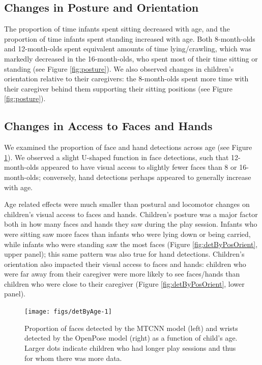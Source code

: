 \documentclass[10pt, letterpaper]{article}
\newenvironment{CodeChunk}{}{}
\begin{document}
\subsection{Changes in Posture and
Orientation}\label{changes-in-posture-and-orientation}

The proportion of time infants spent sitting decreased with age, and the
proportion of time infants spent standing increased with age. Both
8-month-olds and 12-month-olds spent equivalent amounts of time
lying/crawling, which was markedly decreased in the 16-month-olds, who
spent most of their time sitting or standing (see Figure
\ref{fig:posture}). We also observed changes in children's orientation
relative to their caregivers: the 8-month-olds spent more time with
their caregiver behind them supporting their sitting positions (see
Figure \ref{fig:posture}).

\subsection{Changes in Access to Faces and
Hands}\label{changes-in-access-to-faces-and-hands}

We examined the proportion of face and hand detections across age (see
Figure \ref{fig:detByAge}). We observed a slight U-shaped function in
face detections, such that 12-month-olds appeared to have visual access
to slightly fewer faces than 8 or 16-month-olds; conversely, hand
detections perhaps appeared to generally increase with age.

Age related effects were much smaller than postural and locomotor
changes on children's visual access to faces and hands. Children's
posture was a major factor both in how many faces and hands they saw
during the play session. Infants who were sitting saw more faces than
infants who were lying down or being carried, while infants who were
standing saw the most faces (Figure \ref{fig:detByPosOrient}, upper
panel); this same pattern was also true for hand detections. Children's
orientation also impacted their visual access to faces and hands:
children who were far away from their caregiver were more likely to see
faces/hands than children who were close to their caregiver (Figure
\ref{fig:detByPosOrient}, lower panel).

\begin{CodeChunk}
\begin{figure}[h]

{\centering \texttt{[image: figs/detByAge-1]} 

}

\caption[Proportion of faces detected by the MTCNN model (left) and wrists detected by the OpenPose model (right) as a function of child's age]{Proportion of faces detected by the MTCNN model (left) and wrists detected by the OpenPose model (right) as a function of child's age. Larger dots indicate children who had longer play sessions and thus for whom there was more data.}\label{fig:detByAge}
\end{figure}
\end{CodeChunk}
\end{document}
